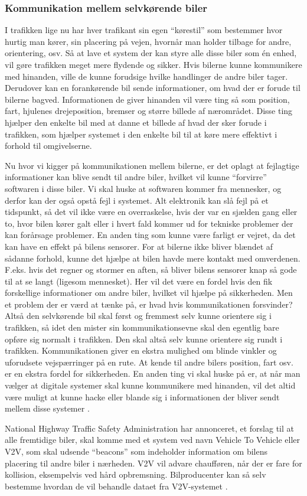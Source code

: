 \subsubsection{Kommunikation mellem selvkørende biler}

I trafikken lige nu har hver trafikant sin egen ``kørestil'' som bestemmer hvor hurtig man kører, sin placering på vejen, hvornår man holder tilbage for andre, orientering, osv. Så at lave et system der kan styre alle disse biler som \'en enhed, vil gøre trafikken meget mere flydende og sikker. Hvis bilerne kunne kommunikere med hinanden, ville de kunne forudsige hvilke handlinger de andre biler tager. Derudover kan en forankørende bil sende informationer, om hvad der er forude til bilerne bagved. Informationen de giver hinanden vil være ting så som position, fart, hjulenes drejeposition, bremser og større billede af nærområdet. Disse ting hjælper den enkelte bil med at danne et billede af hvad der sker forude i trafikken, som hjælper systemet i den enkelte bil til at køre mere effektivt i forhold til omgivelserne. 

Nu hvor vi kigger på kommunikationen mellem bilerne, er det oplagt at fejlagtige informationer kan blive sendt til andre biler, hvilket vil kunne ``forvirre'' softwaren i disse biler. Vi skal huske at  softwaren kommer fra mennesker, og derfor kan der også opstå fejl i systemet. Alt elektronik kan slå fejl på et tidspunkt, så det vil ikke være en overraskelse, hvis der var en sjælden gang eller to, hvor bilen kører galt eller i hvert fald kommer ud for tekniske problemer der kan forårsage problemer. En anden ting som kunne være farligt er vejret, da det kan have en effekt på bilens sensorer. For at bilerne ikke bliver blændet af sådanne forhold, kunne det hjælpe at bilen havde mere kontakt med omverdenen. F.eks. hvis det regner og stormer en aften, så bliver bilens sensorer knap så gode til at se langt (ligesom mennesket). Her vil det være en fordel hvis den fik forskellige informationer om andre biler, hvilket vil hjælpe på sikkerheden. Men et problem der er værd at tænke på, er hvad hvis kommunikationen forsvinder? Altså den selvkørende bil skal først og fremmest selv kunne orientere sig i trafikken, så idet den mister sin kommunikationsevne skal den egentlig bare opføre sig normalt i trafikken. Den skal altså selv kunne orientere sig rundt i trafikken. Kommunikationen giver en ekstra mulighed om blinde vinkler og uforudsete vejspærringer på en rute. At kende til andre bilers position, fart osv. er en ekstra fordel for sikkerheden. En anden ting vi skal huske på er, at når man vælger at digitale systemer skal kunne kommunikere med hinanden, vil det altid være muligt at kunne hacke eller blande sig i informationen der bliver sendt mellem disse systemer \cite{car_to_car}.

National Highway Traffic Safety Administration har annonceret, et forslag til at alle fremtidige biler, skal komme med et system ved navn Vehicle To Vehicle eller V2V, som skal udsende ``beacons'' som indeholder information om bilens placering til andre biler i nærheden. V2V vil advare chaufføren, når der er fare for kollision, eksempelvis ved hård opbremsning. Bilproducenter kan så selv bestemme hvordan de vil behandle dataet fra V2V-systemet \cite{V2V}.